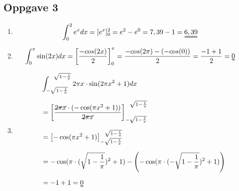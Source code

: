 \documentclass[norsk,11pt,a4paper]{report}
\newcommand{\oppgave}[1]{\subsection*{Oppgave #1}}
\newcommand{\oppgaveDelStart}{\begin{enumerate}[leftmargin=*,itemsep=1cm,labelsep=1.5em,label=\alph*)]}
\newcommand{\oppgaveDelSlutt}{\end{enumerate}}
\newcommand{\oppgaveDel}[1]{\item[#1)]}
\newcommand{\m}{\cdot}
\begin{document}
\oppgave{3}
\oppgaveDelStart
\oppgaveDel{a} \begin{align*}&\int_{0}^{2} e^x dx = [e^x]_{0}^{2} = e^2 - e^0 = 7,39 - 1 = \uuline{6,39}\end{align*}
\oppgaveDel{b} \begin{align*}&\int_{0}^{\pi} \sin (2x) dx = \left[ \frac{-cos(2x)}{2} \right]_{0}^{\pi} = \frac{-cos(2\pi) - (-cos(0))}{2} = \frac{-1 + 1}{2} = \uuline{0}\end{align*}
\oppgaveDel{c}
\begin{align*}
&\int_{-\sqrt{1-\frac{1}{\pi}}}^{\ \ \sqrt{1-\frac{1}{\pi}}} 2 \pi x \m \sin (2 \pi x^2 + 1) dx\\[0.2cm]
&= \left[ \frac{\cancel{2 \pi x} \m (-\cos(\pi x^2 + 1))}{\cancel{2 \pi x}} \right]_{-\sqrt{1-\frac{1}{\pi}}}^{\ \ \sqrt{1-\frac{1}{\pi}}}\\[0.2cm]
&= \left[ -\cos(\pi x^2 + 1) \right]_{-\sqrt{1-\frac{1}{\pi}}}^{\ \ \sqrt{1-\frac{1}{\pi}}}\\[0.2cm]
&= -\cos(\pi \m (\sqrt{1-\frac{1}{\pi}})^2 + 1) - \left( -\cos(\pi \m (-\sqrt{1-\frac{1}{\pi}})^2 + 1) \right)\\[0.2cm]
&= -1 + 1 = \uuline{0}
\end{align*}
\oppgaveDelSlutt

\end{document}
